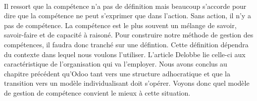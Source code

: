 \paragraph{}Il ressort que la compétence n'a pas de définition mais beaucoup s'accorde pour dire que la compétence ne peut s'exprimer que dans l'action. Sans action, il n'y a pas de compétence. La compétence est le plus souvent un mélange de savoir, savoir-faire et de capacité à raisoné. Pour construire notre méthode de gestion des compétences, il faudra donc tranché sur une défintion. Cette définition dépendra du contexte dans lequel nous voulons l'utiliser. L'article Delobbe\citep[pp.31]{delobbe} lie celle-ci aux caractéristique de l'organisation qui va l'employer. Nous avons conclus au chapitre précédent qu'Odoo tant vers une structure adhocratique et que la transition vers un modèle individualisant doit s'opérer. Voyons donc quel modèle de gestion de compétence convient le mieux à cette situation.


